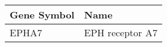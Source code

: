 \begin{tabular}{ll}
\toprule
Gene Symbol &            Name \\
\midrule
      EPHA7 & EPH receptor A7 \\
\bottomrule
\end{tabular}
